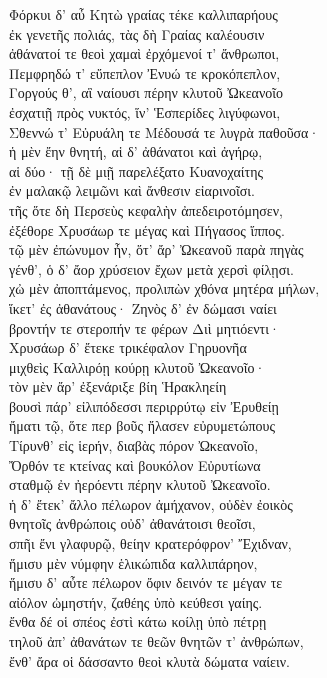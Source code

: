 \begin{pages}
\begin{Leftside}
Φόρκυι δ' αὖ Κητὼ γραίας τέκε καλλιπαρήους \\
ἐκ γενετῆς πολιάς, τὰς δὴ Γραίας καλέουσιν\\
ἀθάνατοί τε θεοὶ χαμαὶ ἐρχόμενοί τ' ἄνθρωποι,\\
Πεμφρηδώ τ' εὔπεπλον Ἐνυώ τε κροκόπεπλον,\\
Γοργούς θ', αἳ ναίουσι πέρην κλυτοῦ Ὠκεανοῖο\\
ἐσχατιῇ πρὸς νυκτός, ἵν' Ἑσπερίδες λιγύφωνοι, \\
Σθεννώ τ' Εὐρυάλη τε Μέδουσά τε λυγρὰ παθοῦσα· \\
ἡ μὲν ἔην θνητή, αἱ δ' ἀθάνατοι καὶ ἀγήρῳ, \\
αἱ δύο· τῇ δὲ μιῇ παρελέξατο Κυανοχαίτης \\
ἐν μαλακῷ λειμῶνι καὶ ἄνθεσιν εἰαρινοῖσι. \\
τῆς ὅτε δὴ Περσεὺς κεφαλὴν ἀπεδειροτόμησεν,  \\
ἐξέθορε Χρυσάωρ τε μέγας καὶ Πήγασος ἵππος.\\
τῷ μὲν ἐπώνυμον ἦν, ὅτ' ἄρ' Ὠκεανοῦ παρὰ πηγὰς\\
γένθ', ὁ δ' ἄορ χρύσειον ἔχων μετὰ χερσὶ φίλῃσι. \\
χὠ μὲν ἀποπτάμενος, προλιπὼν χθόνα μητέρα μήλων,\\
ἵκετ' ἐς ἀθανάτους· Ζηνὸς δ' ἐν δώμασι ναίει  \\
βροντήν τε στεροπήν τε φέρων Διὶ μητιόεντι·\\
Χρυσάωρ δ' ἔτεκε τρικέφαλον Γηρυονῆα\\
μιχθεὶς Καλλιρόῃ κούρῃ κλυτοῦ Ὠκεανοῖο· \\
τὸν μὲν ἄρ' ἐξενάριξε βίη Ἡρακληείη\\
βουσὶ πάρ' εἰλιπόδεσσι περιρρύτῳ εἰν Ἐρυθείῃ \\
ἤματι τῷ, ὅτε περ βοῦς ἤλασεν εὐρυμετώπους \\
Τίρυνθ' εἰς ἱερήν, διαβὰς πόρον Ὠκεανοῖο, \\
Ὄρθόν τε κτείνας καὶ βουκόλον Εὐρυτίωνα\\
σταθμῷ ἐν ἠερόεντι πέρην κλυτοῦ Ὠκεανοῖο.\\

\quad{}ἡ δ' ἔτεκ' ἄλλο πέλωρον ἀμήχανον, οὐδὲν ἐοικὸς  \\
θνητοῖς ἀνθρώποις οὐδ' ἀθανάτοισι θεοῖσι, \\
σπῆι ἔνι γλαφυρῷ, θείην κρατερόφρον' Ἔχιδναν, \\
ἥμισυ μὲν νύμφην ἑλικώπιδα καλλιπάρηον, \\
ἥμισυ δ' αὖτε πέλωρον ὄφιν δεινόν τε μέγαν τε\\
αἰόλον ὠμηστήν, ζαθέης ὑπὸ κεύθεσι γαίης.  \\
ἔνθα δέ οἱ σπέος ἐστὶ κάτω κοίλῃ ὑπὸ πέτρῃ\\
τηλοῦ ἀπ' ἀθανάτων τε θεῶν θνητῶν τ' ἀνθρώπων,\\
ἔνθ' ἄρα οἱ δάσσαντο θεοὶ κλυτὰ δώματα ναίειν.\\


\end{Leftside}
\end{pages}

